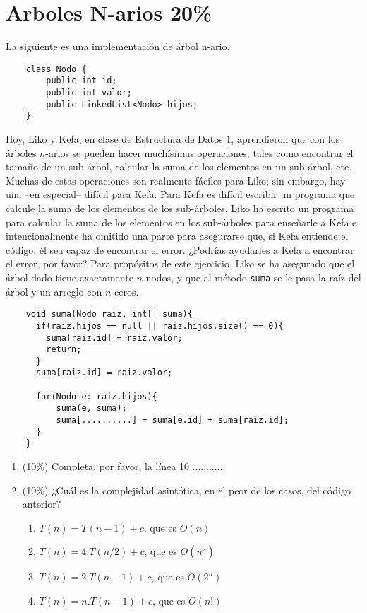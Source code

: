\documentclass[10 pt]{article}
\begin{document}
\begin{multicols}{2}
\begin{enumerate}[label=\alph*]
\end{enumerate}

	\section{Arboles N-arios 20\%}
	La siguiente es una implementación de árbol n-ario.
	\begin{lstlisting}
	class Nodo {
		public int id;
		public int valor;
		public LinkedList<Nodo> hijos;
	}
	\end{lstlisting}
	Hoy, Liko y Kefa, en clase de Estructura de Datos 1, aprendieron que con los árboles $n$-arios se pueden hacer muchísimas operaciones, tales como encontrar el tamaño de un sub-árbol, calcular la suma de los elementos en un sub-árbol, etc. Muchas de estas operaciones son realmente fáciles para Liko; sin embargo, hay una --en especial-- difícil para Kefa. Para Kefa es difícil escribir un programa que calcule la suma de los elementos de los sub-árboles. Liko ha escrito un programa para calcular la suma de los elementos en los sub-árboles para enseñarle a Kefa e intencionalmente ha omitido una parte para asegurarse que, si Kefa entiende el código, él sea capaz de encontrar el error. ¿Podrías ayudarles a Kefa a encontrar el error, por favor? Para propósitos de este ejercicio, Liko se ha asegurado que el árbol dado tiene exactamente $n$ nodos, y que al método \texttt{suma} se le pasa la raíz del árbol y un arreglo con $n$ ceros.
	\begin{lstlisting}
	void suma(Nodo raiz, int[] suma){
	  if(raiz.hijos == null || raiz.hijos.size() == 0){
	    suma[raiz.id] = raiz.valor;
	    return;  
	  }
	  suma[raiz.id] = raiz.valor;
	  
	  for(Nodo e: raiz.hijos){
	      suma(e, suma);
	      suma[..........] = suma[e.id] + suma[raiz.id]; 
	  }
	}
	\end{lstlisting}
	\begin{enumerate}[label=\alph*)]
		\item (10\%) Completa, por favor, la línea 10 ............
		\item (10\%) ¿Cuál es la complejidad asintótica, en el peor de los casos, del código anterior?
		\begin{enumerate}[label=\roman*)]
			\item $T(n) = T(n-1) +   c$, que es $O(n)$
			\item $T(n) = 4.T(n/2) + c$, que es $O(n^2)$
			\item $T(n) = 2.T(n-1) + c$, que es $O(2^n)$
			\item $T(n) = n.T(n-1) + c$, que es $O(n!)$
		\end{enumerate} 
	\end{enumerate}

\end{multicols}
\end{document}
